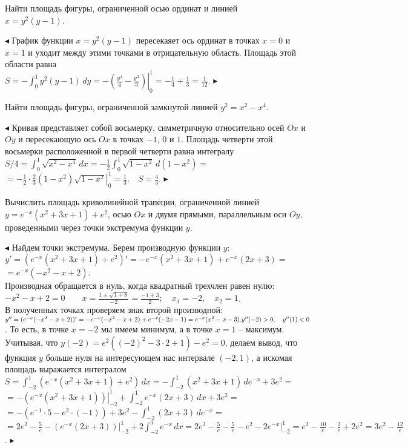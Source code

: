 \documentclass[a5paper,10pt]{article}
\begin{document}
\medskip
{} Найти площадь фигуры, ограниченной осью ординат и линией\\
$x=y^2(y-1)$.

\medskip
\noindent $\blacktriangleleft$ График функции $x=y^2(y-1)$ пересекаяет ось ординат
в точках $x=0$ и $x=1$ и уходит между этими точками в отрицательную область. Площадь
этой области равна\\
$\displaystyle S=-\int_0^1y^2(y-1)\,dy=-\left.\left(\frac{y^4}{4}-
\frac{y^3}{3}\right)\right|_0^1=-\frac14+\frac13=\frac{1}{12}$.
$\blacktriangleright$

\medskip
{} Найти площадь фигуры, ограниченной замкнутой линией
$y^2=x^2-x^4$.

\medskip
\noindent $\blacktriangleleft$ Кривая представляет собой восьмерку, симметричную
относительно осей $Ox$ и $Oy$ и пересекающую ось $Ox$ в точках $-1$, $0$ и $1$.
Площадь четверти этой восьмерки расположенной в первой четверти равна интегралу\\
$\displaystyle S/4=\int_0^1\sqrt{x^2-x^4}\,dx=-\frac12\int_0^1\sqrt{1-x^2}\,d(1-x^2)=$\\
$\displaystyle =-\left.\frac12\cdot\frac23(1-x^2)\sqrt{1-x^2}\right|_0^1=\frac13.\quad
S=\frac{4}{3}$. $\blacktriangleright$

\medskip
{} Вычислить площадь криволинейной трапеции, ограниченной линией\\
$y=e^{-x}(x^2+3x+1)+e^2$, осью $Ox$ и двумя прямыми,
параллельным оси $Oy$, проведенными через точки экстремума функции $y$.

\medskip
\noindent $\blacktriangleleft$ Найдем точки экстремума. Берем производную
функции $y$:\\
$y'=(e^{-x}(x^2+3x+1)+e^2)'=-e^{-x}(x^2+3x+1)+e^{-x}(2x+3)=$\\
$\displaystyle =e^{-x}(-x^2-x+2)$.\\
Производная обращается в нуль, когда квадратный трехчлен равен нулю:\\
$\displaystyle -x^2-x+2=0\qquad x=\frac{1\pm\sqrt{1+8}}{-2}=
\frac{-1\mp3}{2};\quad x_1=-2,\quad x_2=1$.\\
В полученных точках проверяем знак второй производной:\\
$y''=(e^{-x}(-x^2-x+2))'=-e^{-x}(-x^2-x+2)+e^{-x}(-2x-1)=
e^{-x}(x^2-x-3).\\
y''(-2)>0,\quad y''(1)<0$.
То есть, в точке $x=-2$ мы имеем минимум, а в точке $x=1$ -- максимум.
Учитывая, что $y(-2)=e^2((-2)^2-3\cdot 2+1)-e^2=0$, делаем вывод, что функция $y$
больше нуля на интересующем нас интервале $(-2,1)$, а искомая площадь
выражается интегралом\\
$\displaystyle S=\int_{-2}^1(e^{-x}(x^2+3x+1)+e^2)\,dx=
-\int_{-2}^1(x^2+3x+1)\,de^{-x}+3e^2=$\\
$\displaystyle =-\left.(e^{-x}(x^2+3x+1))\right|_{-2}^1+\int_{-2}^1e^{-x}(2x+3)\,dx+3e^2=$\\
$\displaystyle =-(e^{-1}\cdot5-e^2\cdot(-1))+3e^2-\int_{-2}^1(2x+3)\,de^{-x}=$\\
$\displaystyle =2e^2-\frac5e-\left.(e^{-x}(2x+3))\right|_{-2}^1+2\int_{-2}^1e^{-x}\,dx=
2e^2-\frac5e-\frac5e-e^2-2\left.e^{-x}\right|_{-2}^1=
e^2-\frac{10}{e}-\frac{2}{e}+2e^2=3e^2-\frac{12}{e}$.
$\blacktriangleright$
\end{document}
